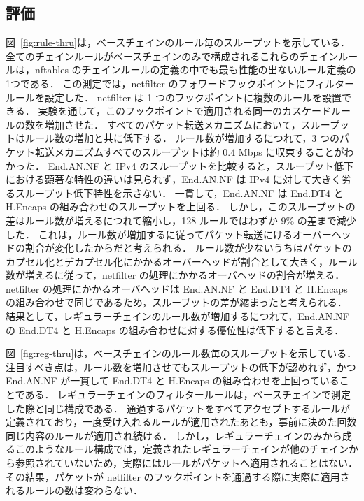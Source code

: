 \subsection{評価}
\label{ssec:thru-chains.eval}
図~\ref{fig:rule-thru}は，ベースチェインのルール毎のスループットを示している．
全てのチェインルールがベースチェインのみで構成されるこれらのチェインルールは，nftables のチェインルールの定義の中でも最も性能の出ないルール定義の1つである．
この測定では，netfilter のフォワードフックポイントにフィルタールールを設定した．
netfilter は 1 つのフックポイントに複数のルールを設置できる．
実験を通して，このフックポイントで適用される同一のカスケードルールの数を増加させた．
すべてのパケット転送メカニズムにおいて，スループットはルール数の増加と共に低下する．
ルール数が増加するにつれて，3 つのパケット転送メカニズムすべてのスループットは約 0.4 Mbps に収束することがわかった．
End.AN.NF と IPv4 のスループットを比較すると，スループット低下における顕著な特性の違いは見られず，End.AN.NF は IPv4 に対して大きく劣るスループット低下特性を示さない．
一貫して，End.AN.NF は End.DT4 と H.Encaps の組み合わせのスループットを上回る．
しかし，このスループットの差はルール数が増えるにつれて縮小し，128 ルールではわずか 9\% の差まで減少した．
これは，ルール数が増加するに従ってパケット転送にけるオーバーヘッドの割合が変化したからだと考えられる．
ルール数が少ないうちはパケットのカプセル化とデカプセル化にかかるオーバーヘッドが割合として大きく，ルール数が増えるに従って，netfilter の処理にかかるオーバヘッドの割合が増える．
netfilter の処理にかかるオーバヘッドは End.AN.NF と End.DT4 と H.Encaps の組み合わせで同じであるため，スループットの差が縮まったと考えられる．
結果として，レギュラーチェインのルール数が増加するにつれて，End.AN.NF の End.DT4 と H.Encaps の組み合わせに対する優位性は低下すると言える．


図~\ref{fig:reg-thru}は，ベースチェインのルール数毎のスループットを示している．
注目すべき点は，ルール数を増加させてもスループットの低下が認めれず，かつ End.AN.NF が一貫して End.DT4 と H.Encaps の組み合わせを上回っていることである．
レギュラーチェインのフィルタールールは，ベースチェインで測定した際と同じ構成である．
通過するパケットをすべてアクセプトするルールが定義されており，一度受け入れるルールが適用されたあとも，事前に決めた回数同じ内容のルールが適用され続ける．
しかし，レギュラーチェインのみから成るこのようなルール構成では，定義されたレギュラーチェインが他のチェインから参照されていないため，実際にはルールがパケットへ適用されることはない．
その結果，パケットが netfilter のフックポイントを通過する際に実際に適用されるルールの数は変わらない．

